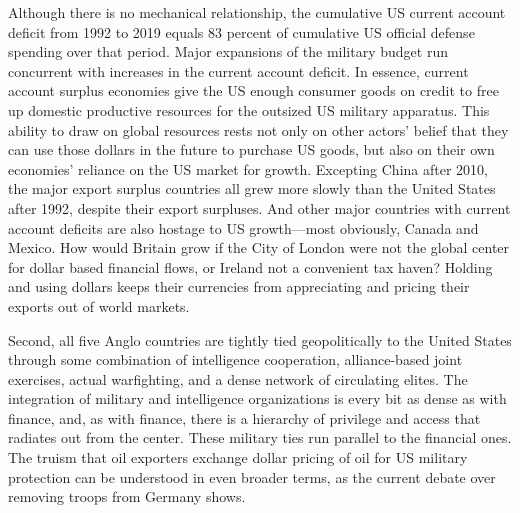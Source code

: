 \documentclass[
]{book}
\begin{document}
Although there is no mechanical relationship, the cumulative US current account deficit from 1992 to 2019 equals 83 percent of cumulative US official defense spending over that period. Major expansions of the military budget run concurrent with increases in the current account deficit. In essence, current account surplus economies give the US enough consumer goods on credit to free up domestic productive resources for the outsized US military apparatus. This ability to draw on global resources rests not only on other actors' belief that they can use those dollars in the future to purchase US goods, but also on their own economies' reliance on the US market for growth. Excepting China after 2010, the major export surplus countries all grew more slowly than the United States after 1992, despite their export surpluses. And other major countries with current account deficits are also hostage to US growth---most obviously, Canada and Mexico. How would Britain grow if the City of London were not the global center for dollar based financial flows, or Ireland not a convenient tax haven? Holding and using dollars keeps their currencies from appreciating and pricing their exports out of world markets.

Second, all five Anglo countries are tightly tied geopolitically to the United States through some combination of intelligence cooperation, alliance-based joint exercises, actual warfighting, and a dense network of circulating elites. The integration of military and intelligence organizations is every bit as dense as with finance, and, as with finance, there is a hierarchy of privilege and access that radiates out from the center. These military ties run parallel to the financial ones. The truism that oil exporters exchange dollar pricing of oil for US military protection can be understood in even broader terms, as the current debate over removing troops from Germany shows.
\end{document}
